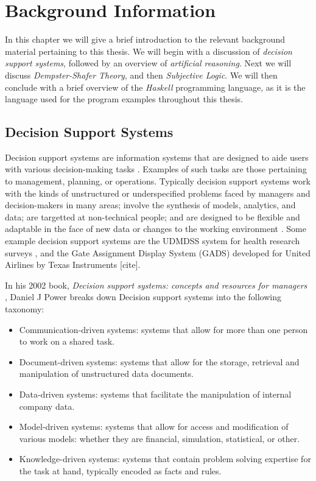 \documentclass[thesis.tex]{subfiles}
\begin{document}
\chapter{Background Information}
\label{chap:background-information}

In this chapter we will give a brief introduction to the relevant background material pertaining
to this thesis. We will begin with a discussion of \emph{decision support systems}, followed by
an overview of \emph{artificial reasoning}. Next we will discuss \emph{Dempster-Shafer Theory}, and
then \emph{Subjective Logic}. We will then conclude with
a brief overview of the \emph{Haskell} programming language, as it is the language used for the program
examples throughout this thesis.






\section{Decision Support Systems}

Decision support systems are information systems that are designed to aide users with various
decision-making tasks \cite{sprague1980framework}. Examples of such tasks are those pertaining to management,
planning, or operations. Typically decision support systems work with the kinds of unstructured
or underspecified problems faced by managers and decision-makers in many areas; involve the
synthesis of models, analytics, and data; are targetted at non-technical people; and are designed
to be flexible and adaptable in the face of new data or changes to the working environment
\cite{sprague1980framework}. Some example decision support systems are the UDMDSS system
for health research surveys \cite{kent2010application},
and the Gate Assignment Display System (GADS) developed for United Airlines
by Texas Instruments [cite].

In his 2002 book, \emph{Decision support systems: concepts and resources for managers}
\cite{power2002decision}, Daniel J Power breaks down Decision support systems into the following
taxonomy:

\begin{itemize}
  \item Communication-driven systems: systems that allow for more than
    one person to work on a shared task.
  \item Document-driven systems: systems that allow for the storage,
    retrieval and manipulation of unstructured data documents.
  \item Data-driven systems: systems that facilitate the manipulation
    of internal company data.
  \item Model-driven systems: systems that allow for access and
    modification of various models: whether they are financial,
    simulation, statistical, or other.
  \item Knowledge-driven systems: systems that contain problem solving
    expertise for the task at hand, typically encoded as facts and
    rules.
\end{itemize}
\end{document}
